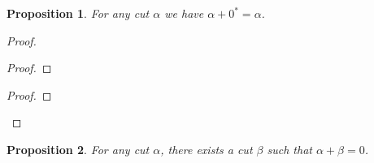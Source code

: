 \documentclass{book}
\let\qed\relax
\newtheorem{prop}{Proposition}[chapter]
\theoremstyle{definition}
\begin{document}
\begin{prop}
For any cut $\alpha$ we have $\alpha + 0^* = \alpha$.
\end{prop}

\begin{proof}
\pf
{}
\begin{proof}
\end{proof}
\begin{proof}
\end{proof}
\qed
\end{proof}

\begin{prop}
For any cut $\alpha$, there exists a cut $\beta$ such that $\alpha + \beta = 0$.
\end{prop}
\end{document}
